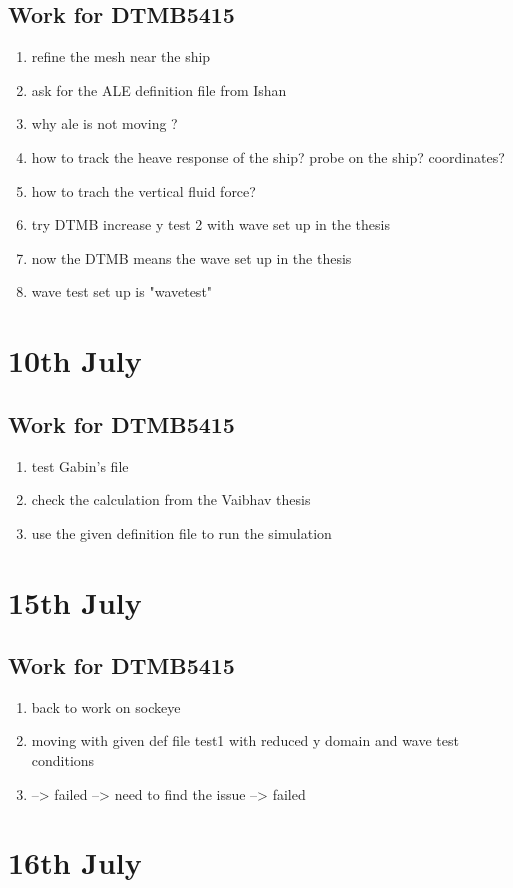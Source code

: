 \documentclass[12pt]{article} %
\begin{document}
\subsection{Work for DTMB5415}
\begin{enumerate}
    \item refine the mesh near the ship
    \item ask for the ALE definition file from Ishan
    \item why ale is not moving ?
    \item how to track the heave response of the ship? probe on the ship? coordinates?
    \item how to trach the vertical fluid force? 
    \item try DTMB increase y test 2 with wave set up in the thesis
    \item now the DTMB means the wave set up in the thesis
    \item wave test set up is "wavetest"
\end{enumerate}
\section{10th July}
\subsection{Work for DTMB5415}
\begin{enumerate}
    \item test Gabin's file
    \item check the calculation from the Vaibhav thesis
    \item use the given definition file to run the simulation
\end{enumerate}
\section{15th July}
\subsection{Work for DTMB5415}
\begin{enumerate}
    \item back to work on sockeye
    \item moving with given def file test1 with reduced y domain and wave test conditions
    \item --> failed --> need to find the issue --> failed 
\end{enumerate}
\section{16th July}
\end{document}

